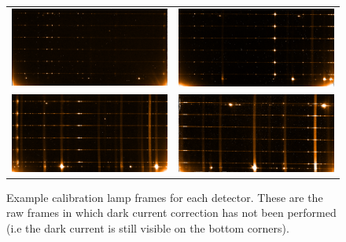 
\begin{figure}
    \begin{tabular}{cc}
         \includegraphics[width=.45\hsize]{./figures/reduction/Thar_1.png} & \includegraphics[width=.45\hsize]{./figures/reduction/Thar_2.png} \\
         \includegraphics[width=.45\hsize]{./figures/reduction/Thar_3.png} & \includegraphics[width=.45\hsize]{./figures/reduction/Thar_4.png} \\
    \end{tabular}

    \caption{Example \thar{} calibration lamp frames for each detector.
        These are the raw frames in which dark current correction has not been performed (i.e the dark current is still visible on the bottom corners).}
    \label{fig:caliblamps}
\end{figure}


